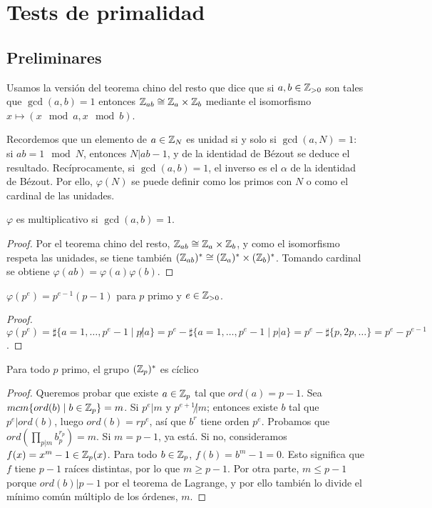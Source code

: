 \documentclass[CR.tex]{subfiles}
\begin{document}

\chapter{Tests de primalidad}
\section{Preliminares}
Usamos la versión del teorema chino del resto que dice que si $a,b\in\mathbb{Z}_{>0}$ son tales que $\gcd(a,b)=1$ entonces $\mathbb{Z}_{ab}\cong \mathbb{Z}_a\times\mathbb{Z}_b$ mediante el isomorfismo $x\mapsto (x\mod a,x\mod b)$. 

Recordemos que un elemento de $a\in \mathbb{Z}_N$ es unidad si y solo si $\gcd(a,N)=1$: si $ab=1\mod N$, entonces $N|ab-1$, y de la identidad de Bézout se deduce el resultado. Recíprocamente, si $\gcd(a,b)=1$, el inverso es el $\alpha$ de la identidad de Bézout. Por ello, $\varphi(N)$ se puede definir como los primos con $N$ o como el cardinal de las unidades.

\begin{lemma}
$\varphi$ es multiplicativo si $\gcd(a,b)=1$. 
\end{lemma}
\begin{proof}
Por el teorema chino del resto, $\mathbb{Z}_{ab}\cong\mathbb{Z}_a\times\mathbb{Z}_b$, y como el isomorfismo respeta las unidades, se tiene también $(\mathbb{Z}_{ab})^*\cong(\mathbb{Z}_a)^*\times(\mathbb{Z}_b)^*$. Tomando cardinal se obtiene $\varphi(ab)=\varphi(a)\varphi(b)$. 
\end{proof}
\begin{lemma}
$\varphi(p^e)=p^{e-1}(p-1)$ para $p$ primo y $e\in\mathbb{Z}_{>0}$.
\end{lemma}
\begin{proof}
$\varphi(p^e)=\sharp\{a=1,\dots, p^e-1\mid p\not| a\}=p^e-\sharp\{a=1,\dots, p^e-1\mid p|a\}=p^e-\sharp\{p,2p,\dots\}=p^e-p^{e-1}$.
\end{proof}


\begin{lemma}
Para todo $p$ primo, el grupo $(\mathbb{Z}_p)^*$ es cíclico 
\end{lemma}
\begin{proof}
Queremos probar que existe $a\in\mathbb{Z}_p$ tal que $ord(a)=p-1$. Sea $mcm\{ord(b)\mid b\in\mathbb{Z}_p\}=m$. Si $p^e|m$ y $p^{e+1}\not| m$; entonces existe $b$ tal que $p^e| ord(b)$, luego $ord(b)=rp^e$, así que $b^{r}$ tiene orden $p^e$. Probamos que $ord(\prod_{p|m}b_p^{r_p})=m$. Si $m=p-1$, ya está. Si no, consideramos $f(x)=x^m-1\in\mathbb{Z}_p(x)$. Para todo $b\in\mathbb{Z}_p$, $f(b)=b^m-1=0$. Esto significa que $f$ tiene $p-1$ raíces distintas, por lo que $m\geq p-1$. Por otra parte, $m\leq p-1$ porque $ord(b)|p-1$ por el teorema de Lagrange, y por ello también lo divide el mínimo común múltiplo de los órdenes, $m$. 
\end{proof}
\end{document}
